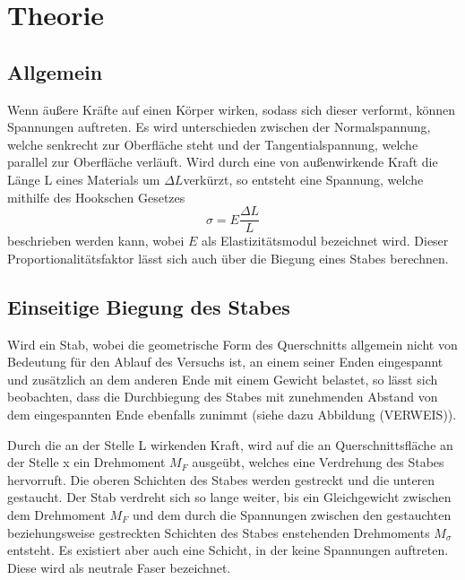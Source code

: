 \section{Theorie}
\label{sec:Theorie}

\subsection{Allgemein}

Wenn äußere Kräfte auf einen Körper wirken, sodass 
sich dieser verformt, können Spannungen auftreten.
Es wird unterschieden zwischen der Normalspannung,
welche senkrecht zur Oberfläche steht und der 
Tangentialspannung, welche parallel zur Oberfläche 
verläuft. Wird durch eine von außenwirkende Kraft 
die Länge L eines Materials um $\Delta L $verkürzt, 
so entsteht eine Spannung, welche mithilfe
des Hookschen Gesetzes
\begin{equation}
    \sigma = E \frac{\Delta L}{L}
\end{equation}
\noindent beschrieben werden kann, wobei $E$ als
Elastizitätsmodul bezeichnet wird. Dieser 
Proportionalitätsfaktor lässt sich auch über die 
Biegung eines Stabes berechnen.


\subsection{Einseitige Biegung des Stabes}

Wird ein Stab, wobei die geometrische Form des 
Querschnitts allgemein nicht von Bedeutung für den
Ablauf des Versuchs ist, an einem seiner Enden
eingespannt und zusätzlich an dem anderen Ende mit 
einem Gewicht belastet, so lässt sich beobachten,
dass die Durchbiegung des Stabes mit zunehmenden
Abstand von dem eingespannten Ende ebenfalls 
zunimmt (siehe dazu Abbildung (VERWEIS)).

Durch die an der Stelle L wirkenden Kraft, wird auf
die an Querschnittsfläche an der Stelle x ein 
Drehmoment $M_F$ ausgeübt, welches eine Verdrehung 
des Stabes hervorruft. Die oberen Schichten des 
Stabes werden gestreckt und die unteren gestaucht. 
Der Stab verdreht sich so lange weiter, bis ein 
Gleichgewicht zwischen dem Drehmoment $M_F$
und dem durch die Spannungen zwischen den gestauchten
beziehungsweise gestreckten Schichten des Stabes 
enstehenden Drehmoments $M_{\sigma}$ entsteht.
Es existiert aber auch eine Schicht, in der keine 
Spannungen auftreten. Diese wird als neutrale
Faser bezeichnet.

